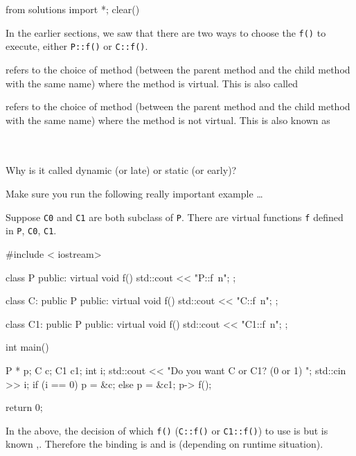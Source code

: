\begin{python0}
from solutions import *; clear()
\end{python0}

In the earlier sections, we saw that there are two ways to choose the \verb!f()! to execute, either \verb!P::f()! or \verb!C::f()!.

 refers to the choice of method (between the parent method and the child method with the same name) where the method is virtual. This is also called 

 refers to the choice of method (between the parent method and the child method with the same name) where the method is not virtual. This is also known as 

\\
\\

Why is it called dynamic (or late) or static (or early)?

Make sure you run the following really important example \ldots

Suppose \verb!C0! and \verb!C1! are both subclass of \verb!P!. There are virtual functions \verb!f! defined in \verb!P!, \verb!C0!, \verb!C1!.

\begin{console}
#include < iostream>

class P
{
public:
     virtual void f() { std::cout << "P::f\ n"; }
};

class C: public P
{
public:
     virtual void f() { std::cout << "C::f\ n"; }
};

class C1: public P
{
public:
     virtual void f() { std::cout << "C1::f\ n"; }
};

int main()
{   
    P * p;
    C c;
    C1 c1;
    int i;
    std::cout << "Do you want C or C1? (0 or 1) ";
    std::cin >> i;
    if (i == 0)
    {    
         p = &c;
    }
    else
    {
         p = &c1;
    }
    p-> f();
    
    return 0;
}
\end{console}

In the above, the decision of which \verb!f()! (\verb!C::f()! or \verb!C1::f()!) to use is  but is known ,. Therefore the binding is  and is  (depending on runtime situation).

